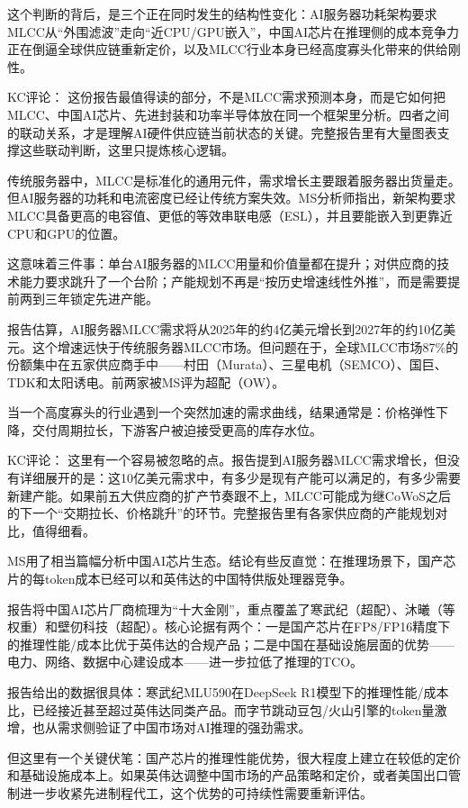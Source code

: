 \documentclass[11pt]{ctexart}
\begin{document}
这个判断的背后，是三个正在同时发生的结构性变化：AI服务器功耗架构要求MLCC从“外围滤波”走向“近CPU/GPU嵌入”，中国AI芯片在推理侧的成本竞争力正在倒逼全球供应链重新定价，以及MLCC行业本身已经高度寡头化带来的供给刚性。

KC评论： 这份报告最值得读的部分，不是MLCC需求预测本身，而是它如何把MLCC、中国AI芯片、先进封装和功率半导体放在同一个框架里分析。四者之间的联动关系，才是理解AI硬件供应链当前状态的关键。完整报告里有大量图表支撑这些联动判断，这里只提炼核心逻辑。

传统服务器中，MLCC是标准化的通用元件，需求增长主要跟着服务器出货量走。但AI服务器的功耗和电流密度已经让传统方案失效。MS分析师指出，新架构要求MLCC具备更高的电容值、更低的等效串联电感（ESL），并且要能嵌入到更靠近CPU和GPU的位置。

这意味着三件事：单台AI服务器的MLCC用量和价值量都在提升；对供应商的技术能力要求跳升了一个台阶；产能规划不再是“按历史增速线性外推”，而是需要提前两到三年锁定先进产能。

报告估算，AI服务器MLCC需求将从2025年的约4亿美元增长到2027年的约10亿美元。这个增速远快于传统服务器MLCC市场。但问题在于，全球MLCC市场87\%的份额集中在五家供应商手中——村田（Murata）、三星电机（SEMCO）、国巨、TDK和太阳诱电。前两家被MS评为超配（OW）。

当一个高度寡头的行业遇到一个突然加速的需求曲线，结果通常是：价格弹性下降，交付周期拉长，下游客户被迫接受更高的库存水位。

KC评论： 这里有一个容易被忽略的点。报告提到AI服务器MLCC需求增长，但没有详细展开的是：这10亿美元需求中，有多少是现有产能可以满足的，有多少需要新建产能。如果前五大供应商的扩产节奏跟不上，MLCC可能成为继CoWoS之后的下一个“交期拉长、价格跳升”的环节。完整报告里有各家供应商的产能规划对比，值得细看。

MS用了相当篇幅分析中国AI芯片生态。结论有些反直觉：在推理场景下，国产芯片的每token成本已经可以和英伟达的中国特供版处理器竞争。

报告将中国AI芯片厂商梳理为“十大金刚”，重点覆盖了寒武纪（超配）、沐曦（等权重）和壁仞科技（超配）。核心论据有两个：一是国产芯片在FP8/FP16精度下的推理性能/成本比优于英伟达的合规产品；二是中国在基础设施层面的优势——电力、网络、数据中心建设成本——进一步拉低了推理的TCO。

报告给出的数据很具体：寒武纪MLU590在DeepSeek R1模型下的推理性能/成本比，已经接近甚至超过英伟达同类产品。而字节跳动豆包/火山引擎的token量激增，也从需求侧验证了中国市场对AI推理的强劲需求。

但这里有一个关键伏笔：国产芯片的推理性能优势，很大程度上建立在较低的定价和基础设施成本上。如果英伟达调整中国市场的产品策略和定价，或者美国出口管制进一步收紧先进制程代工，这个优势的可持续性需要重新评估。
\end{document}
